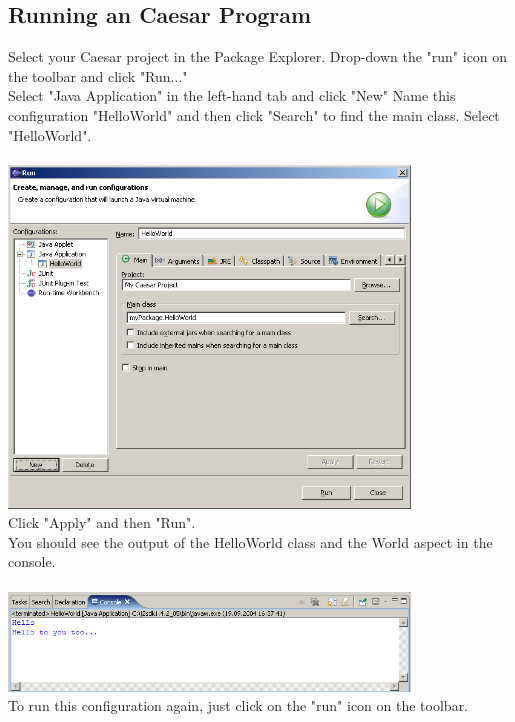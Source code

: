 \subsection{Running an Caesar Program}
Select your Caesar project in the Package Explorer. Drop-down the "run" icon on the toolbar and click "Run..."\\
Select "Java Application" in the left-hand tab and click "New"
Name this configuration "HelloWorld" and then click "Search" to find the main class. Select "HelloWorld".\\\\
\includegraphics[width=0.80\textwidth]{images/run.png}\\

Click "Apply" and then "Run".\\
You should see the output of the HelloWorld class and the World aspect in the console.\\\\
\includegraphics[width=0.80\textwidth]{images/console.png}\\


To run this configuration again, just click on the "run" icon on the toolbar.
